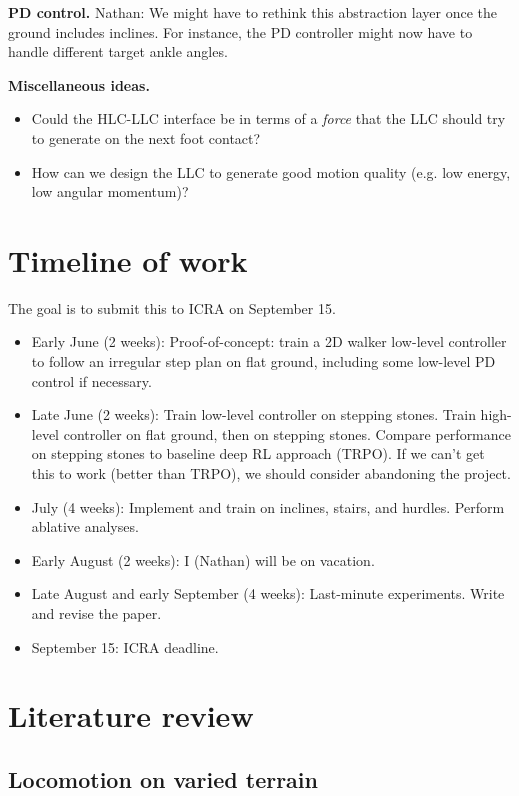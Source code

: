 \documentclass[a4paper]{article}
\newcommand{\nhatch}[1]{{\leavevmode\color{blue} Nathan: #1}}
\begin{document}
\textbf{PD control.}
\nhatch{We might have to rethink this abstraction layer once the ground includes inclines.
For instance, the PD controller might now have to handle different target ankle angles.}

\textbf{Miscellaneous ideas.}
\begin{itemize}
  \item Could the HLC-LLC interface be in terms of a \emph{force} that the LLC should try to generate on the next foot contact?
  \item How can we design the LLC to generate good motion quality (e.g. low energy, low angular momentum)?
\end{itemize}

\section{Timeline of work}

The goal is to submit this to ICRA on September 15.

\begin{itemize}
  \item Early June (2 weeks): Proof-of-concept: train a 2D walker low-level controller to follow an irregular step plan on flat ground, including some low-level PD control if necessary.
  \item Late June (2 weeks): Train low-level controller on stepping stones.
    Train high-level controller on flat ground, then on stepping stones.
    Compare performance on stepping stones to baseline deep RL approach (TRPO).
    If we can't get this to work (better than TRPO), we should consider abandoning the project.
  \item July (4 weeks): Implement and train on inclines, stairs, and hurdles.
    Perform ablative analyses.
  \item Early August (2 weeks): I (Nathan) will be on vacation.
  \item Late August and early September (4 weeks): Last-minute experiments.
    Write and revise the paper.
  \item September 15: ICRA deadline.
\end{itemize}

\section{Literature review}

\subsection*{Locomotion on varied terrain}
\end{document}
